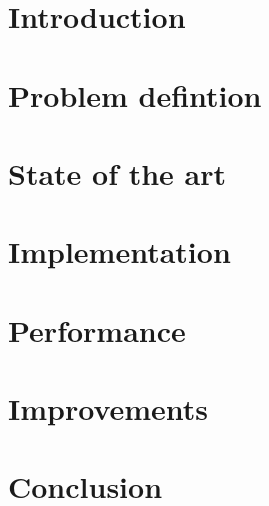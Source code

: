 






\chapter{Introduction}


\chapter{Problem defintion}


\chapter{State of the art}


\chapter{Implementation}


\chapter{Performance}


\chapter{Improvements}


\chapter{Conclusion}



 

\appendix




